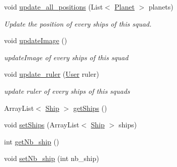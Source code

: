 \begin{DoxyCompactItemize}
\mbox{\label{classfr_1_1groupe40_1_1projet_1_1model_1_1ships_1_1_squad_a19aab0462859c2b4d3f3e4f7eba55fb0}} 
void \hyperlink{classfr_1_1groupe40_1_1projet_1_1model_1_1ships_1_1_squad_a19aab0462859c2b4d3f3e4f7eba55fb0}{update\+\_\+all\+\_\+positions} (List$<$ \hyperlink{classfr_1_1groupe40_1_1projet_1_1model_1_1planets_1_1_planet}{Planet} $>$ planets)
\begin{DoxyCompactList}\small\item\em Update the position of every ships of this squad. \end{DoxyCompactList}\item 
\mbox{\label{classfr_1_1groupe40_1_1projet_1_1model_1_1ships_1_1_squad_ae76aa52a5a5892f28e2b5a89ccc98fa6}} 
void \hyperlink{classfr_1_1groupe40_1_1projet_1_1model_1_1ships_1_1_squad_ae76aa52a5a5892f28e2b5a89ccc98fa6}{update\+Image} ()
\begin{DoxyCompactList}\small\item\em update\+Image of every ships of this squad \end{DoxyCompactList}\item 
void \hyperlink{classfr_1_1groupe40_1_1projet_1_1model_1_1ships_1_1_squad_adaf147d0fd3649c1bf3172c9fd77f096}{update\+\_\+ruler} (\hyperlink{classfr_1_1groupe40_1_1projet_1_1client_1_1_user}{User} ruler)
\begin{DoxyCompactList}\small\item\em update ruler of every ships of this squads \end{DoxyCompactList}\item 
Array\+List$<$ \hyperlink{classfr_1_1groupe40_1_1projet_1_1model_1_1ships_1_1_ship}{Ship} $>$ \hyperlink{classfr_1_1groupe40_1_1projet_1_1model_1_1ships_1_1_squad_a1f5eb0f3d75a52d9f9aeb356eedf603f}{get\+Ships} ()
\item 
void \hyperlink{classfr_1_1groupe40_1_1projet_1_1model_1_1ships_1_1_squad_ab3984439f95320352b71008c4fecce60}{set\+Ships} (Array\+List$<$ \hyperlink{classfr_1_1groupe40_1_1projet_1_1model_1_1ships_1_1_ship}{Ship} $>$ ships)
\item 
int \hyperlink{classfr_1_1groupe40_1_1projet_1_1model_1_1ships_1_1_squad_a7f03812afcb6e3af4cfd589d2557d0ee}{get\+Nb\+\_\+ship} ()
\item 
void \hyperlink{classfr_1_1groupe40_1_1projet_1_1model_1_1ships_1_1_squad_a29e74f6cf438ed28a58fdab135d978e3}{set\+Nb\+\_\+ship} (int nb\+\_\+ship)

\end{DoxyCompactItemize}
